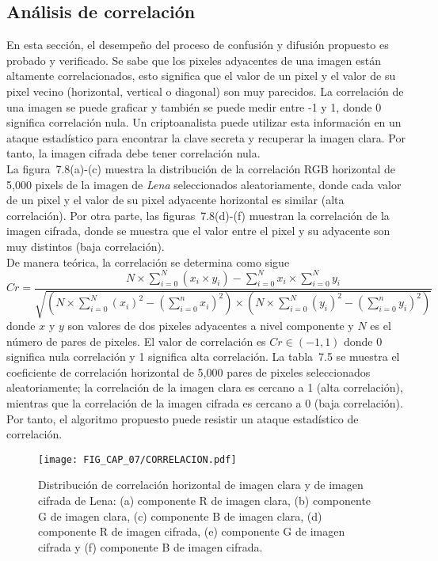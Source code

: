 \subsection{Análisis de correlación}
En esta sección, el desempeño del proceso de confusión y difusión propuesto es probado y verificado. Se sabe que los pixeles adyacentes de una imagen están altamente correlacionados, esto significa que el valor de un pixel y el valor de su pixel vecino (horizontal, vertical o diagonal) son muy parecidos. La correlación de una imagen se puede graficar y también se puede medir entre -1 y 1, donde 0 significa correlación nula. Un criptoanalista puede utilizar esta información en un ataque estadístico para encontrar la clave secreta y recuperar la imagen clara. Por tanto, la imagen cifrada debe tener correlación nula.  \\

La figura~7.8(a)-(c) muestra la distribución de la correlación RGB horizontal de 5,000 pixels de la imagen de \textit{Lena} seleccionados aleatoriamente, donde cada valor de un pixel y el valor de su pixel adyacente horizontal es similar (alta correlación). Por otra parte, las figuras~7.8(d)-(f) muestran la correlación de la imagen cifrada, donde se muestra que el valor entre el pixel y su adyacente son muy distintos (baja correlación).  \\  

De manera teórica, la correlación se determina como sigue
\begin{equation}
Cr=\frac{N\times\sum_{i=0}^{N}(x_{i}\times y_{i})-\sum_{i=0}^{N}x_{i}\times \sum_{i=0}^{N}y_{i}}%
{\sqrt{\left(N\times \sum_{i=0}^{N}(x_{i})^{2}-\left(\sum_{i=0}^{n}x_{i}\right)^{2}\right)\times %
\left(N\times \sum_{i=0}^{N}(y_{i})^{2}-\left(\sum_{i=0}^{n}y_{i}\right)^{2}\right)}}
\end{equation}
donde $x$ y $y$ son valores de dos pixeles adyacentes a nivel componente y $N$ es el número de pares de pixeles. El valor de correlación es $Cr\in (-1,1)$ donde 0 significa nula correlación y 1 significa alta correlación. La tabla~7.5 se muestra el coeficiente de correlación horizontal de 5,000 pares de pixeles seleccionados aleatoriamente; la correlación de la imagen clara es cercano a 1 (alta correlación), mientras que la correlación de la imagen cifrada es cercano a 0 (baja correlación). Por tanto, el algoritmo propuesto puede resistir un ataque estadístico de correlación. 

\begin{figure}[!htbp] %
	\center
	\texttt{[image: FIG\_CAP\_07/CORRELACION.pdf]}   	 
	\caption{Distribución de correlación horizontal de imagen clara y de imagen cifrada de Lena: (a) componente R de imagen clara, (b) componente G de imagen clara, (c) componente B de imagen clara, (d) componente R de imagen cifrada, (e) componente G de imagen cifrada y (f) componente B de imagen cifrada.}
\end{figure}

